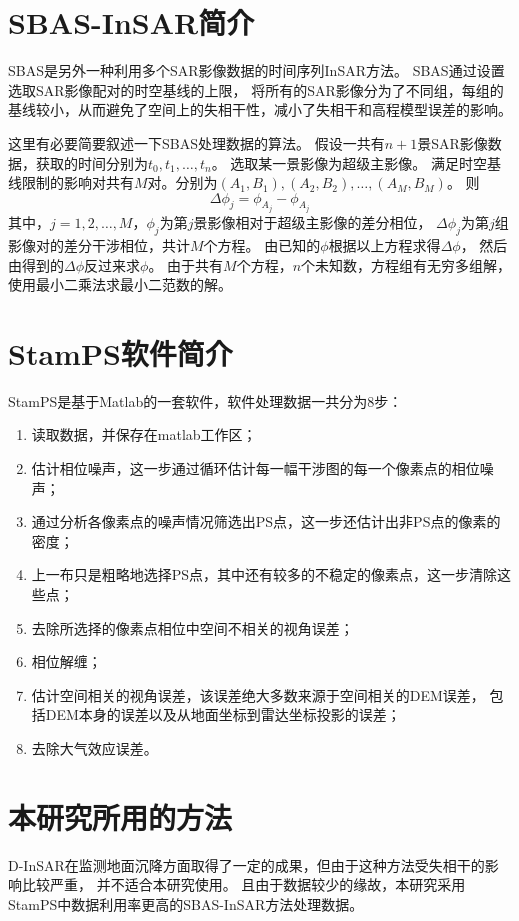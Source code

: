 \section{SBAS-InSAR简介}
SBAS是另外一种利用多个SAR影像数据的时间序列InSAR方法。
SBAS通过设置选取SAR影像配对的时空基线的上限，
将所有的SAR影像分为了不同组，每组的基线较小，从而避免了空间上的失相干性，减小了失相干和高程模型误差的影响。

这里有必要简要叙述一下SBAS处理数据的算法。
假设一共有$n+1$景SAR影像数据，获取的时间分别为$t_0,t_1,\ldots,t_n$。
选取某一景影像为超级主影像。
满足时空基线限制的影响对共有$M$对。分别为$(A_1,B_1),(A_2,B_2),\ldots,(A_M,B_M)$。
则
\begin{equation}
    \Delta\phi_j=\phi_{A_j}-\phi_{A_j}
\end{equation}
其中，$j=1,2,\ldots,M$，$\phi_j$为第$j$景影像相对于超级主影像的差分相位，
$\Delta\phi_j$为第$j$组影像对的差分干涉相位，共计$M$个方程。
由已知的$\phi$根据以上方程求得$\Delta\phi$，
然后由得到的$\Delta\phi$反过来求$\phi$。
由于共有$M$个方程，$n$个未知数，方程组有无穷多组解，使用最小二乘法求最小二范数的解。

\section{StamPS软件简介}
StamPS是基于Matlab的一套软件，软件处理数据一共分为8步：
\begin{enumerate}
    \item 读取数据，并保存在matlab工作区；
    \item 估计相位噪声，这一步通过循环估计每一幅干涉图的每一个像素点的相位噪声；
    \item 通过分析各像素点的噪声情况筛选出PS点，这一步还估计出非PS点的像素的密度；
    \item 上一布只是粗略地选择PS点，其中还有较多的不稳定的像素点，这一步清除这些点；
    \item 去除所选择的像素点相位中空间不相关的视角误差；
    \item 相位解缠；
    \item 估计空间相关的视角误差，该误差绝大多数来源于空间相关的DEM误差，
    包括DEM本身的误差以及从地面坐标到雷达坐标投影的误差；
    \item 去除大气效应误差。
\end{enumerate}

\section{本研究所用的方法}
D-InSAR在监测地面沉降方面取得了一定的成果，但由于这种方法受失相干的影响比较严重，
并不适合本研究使用。
且由于数据较少的缘故，本研究采用StamPS中数据利用率更高的SBAS-InSAR\cite{hooperMultitemporalInSARMethod2008}方法处理数据。
